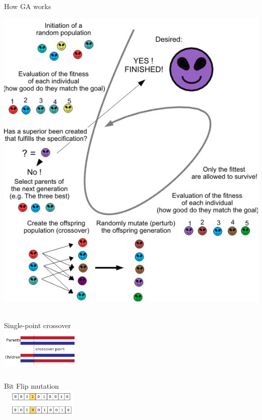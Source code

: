 \begin{frame}{How GA works}
\begin{minipage}[c]{0.59\textwidth}
\includegraphics[width=\textwidth]{new_images/GA_1.png} \\~\\
\end{minipage}
%
\begin{minipage}[c]{0.3\textwidth}
Single-point crossover \\
\includegraphics[width=4cm,height=2cm]{new_images/GA_3.png}\\~\\
Bit Flip mutation \\
\includegraphics[width=4cm,height=0.6cm]{new_images/GA_mut1.png}\\
\includegraphics[width=4cm,height=0.6cm]{new_images/GA_mut2.png} \vspace{2.5cm}\\
\end{minipage}
\end{frame}

